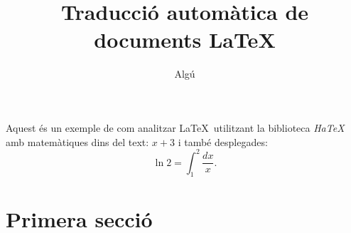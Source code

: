 \documentclass{article}
\author{Algú}
\title{Traducció automàtica de documents \LaTeX}
\begin{document}
\maketitle
Aquest és un exemple de com analitzar \LaTeX\ utilitzant la
biblioteca \emph{HaTeX} amb matemàtiques dins del text: $x+3$ i 
també desplegades:
$$\ln 2 = \int_1^2\frac{dx}{x}.$$
\section{Primera secció}
\end{document}
